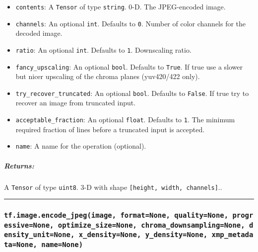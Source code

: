 \begin{itemize}
\tightlist
\item
  \texttt{contents}: A \texttt{Tensor} of type \texttt{string}. 0-D. The
  JPEG-encoded image.
\item
  \texttt{channels}: An optional \texttt{int}. Defaults to \texttt{0}.
  Number of color channels for the decoded image.
\item
  \texttt{ratio}: An optional \texttt{int}. Defaults to \texttt{1}.
  Downscaling ratio.
\item
  \texttt{fancy\_upscaling}: An optional \texttt{bool}. Defaults to
  \texttt{True}. If true use a slower but nicer upscaling of the chroma
  planes (yuv420/422 only).
\item
  \texttt{try\_recover\_truncated}: An optional \texttt{bool}. Defaults
  to \texttt{False}. If true try to recover an image from truncated
  input.
\item
  \texttt{acceptable\_fraction}: An optional \texttt{float}. Defaults to
  \texttt{1}. The minimum required fraction of lines before a truncated
  input is accepted.
\item
  \texttt{name}: A name for the operation (optional).
\end{itemize}

\subparagraph{Returns: }\label{returns}

A \texttt{Tensor} of type \texttt{uint8}. 3-D with shape
\texttt{{[}height,\ width,\ channels{]}}..

\begin{center}\rule{0.5\linewidth}{\linethickness}\end{center}

\subsubsection{\texorpdfstring{\texttt{tf.image.encode\_jpeg(image,\ format=None,\ quality=None,\ progressive=None,\ optimize\_size=None,\ chroma\_downsampling=None,\ density\_unit=None,\ x\_density=None,\ y\_density=None,\ xmp\_metadata=None,\ name=None)}
}{tf.image.encode\_jpeg(image, format=None, quality=None, progressive=None, optimize\_size=None, chroma\_downsampling=None, density\_unit=None, x\_density=None, y\_density=None, xmp\_metadata=None, name=None) }}\label{tf.image.encodeux5fjpegimage-formatnone-qualitynone-progressivenone-optimizeux5fsizenone-chromaux5fdownsamplingnone-densityux5funitnone-xux5fdensitynone-yux5fdensitynone-xmpux5fmetadatanone-namenone}


